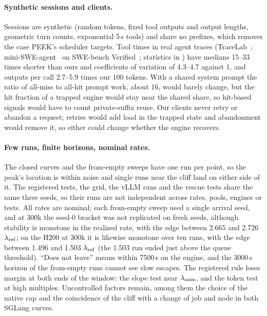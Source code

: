\paragraph{Synthetic sessions and clients.} Sessions are synthetic (random tokens, fixed tool outputs and output lengths, geometric turn counts, exponential 5\,s tools) and share no prefixes, which removes the case PEEK's scheduler targets. Tool times in real agent traces (TraceLab~\citep{zhu2026tracelab}; mini-SWE-agent~\citep{sweagent2026miniswe,yang2024sweagent} on SWE-bench Verified~\citep{jimenez2024swebench,openai2024swebenchverified}; statistics in ) have medians 15--33 times shorter than ours and coefficients of variation of 4.3--4.7 against 1, and outputs per call 2.7--5.9 times our 100 tokens. With a shared system prompt the ratio of all-miss to all-hit prompt work, about 16, would barely change, but the hit fraction of a trapped engine would stay near the shared share, so hit-based signals would have to count private-suffix reuse. Our clients never retry or abandon a request; retries would add load in the trapped state and abandonment would remove it, so either could change whether the engine recovers.

\paragraph{Few runs, finite horizons, nominal rates.} The closed curves and the from-empty sweeps have one run per point, so the peak's location is within noise and single runs near the cliff land on either side of it. The registered tests, the grid, the vLLM runs and the rescue tests share the same three seeds, so their runs are not independent across rates, pools, engines or tests. All rates are nominal; each from-empty sweep used a single arrival seed, and at 300k the seed-0 bracket was not replicated on fresh seeds, although stability is monotone in the realized rate, with the edge between 2.665 and 2.726 $\lambda_{\mathrm{ref}}$; on the H200 at 300k it is likewise monotone over ten runs, with the edge between 1.496 and 1.503 $\lambda_{\mathrm{ref}}$ (the 1.503 run ended just above the queue threshold). ``Does not leave'' means within 7500\,s on the engine, and the 3000\,s horizon of the from-empty runs cannot see slow escapes. The registered rule loses margin at both ends of the window: the slope test near $\lambda_{\mathrm{miss}}$, and the token test at high multiples. Uncontrolled factors remain, among them the choice of the native cap and the coincidence of the cliff with a change of job and node in both SGLang curves.

